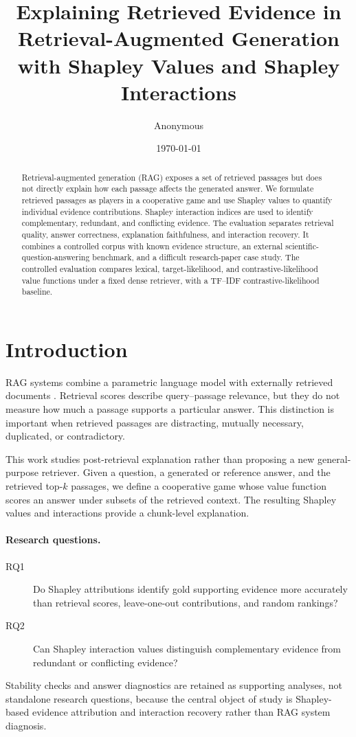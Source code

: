 \documentclass[10pt]{article}
\title{Explaining Retrieved Evidence in Retrieval-Augmented Generation\\
with Shapley Values and Shapley Interactions}
\author{Anonymous}
\date{\today}
\begin{document}
\maketitle

\begin{abstract}
Retrieval-augmented generation (RAG) exposes a set of retrieved passages but
does not directly explain how each passage affects the generated answer.
We formulate retrieved passages as players in a cooperative game and use
Shapley values to quantify individual evidence contributions. Shapley
interaction indices are used to identify complementary, redundant, and
conflicting evidence. The evaluation separates retrieval quality, answer
correctness, explanation faithfulness, and interaction recovery. It combines
a controlled corpus with known evidence structure, an external
scientific-question-answering benchmark, and a difficult research-paper case
study. The controlled evaluation compares lexical, target-likelihood, and
contrastive-likelihood value functions under a fixed dense retriever, with a
TF--IDF contrastive-likelihood baseline.
\end{abstract}

\section{Introduction}
RAG systems combine a parametric language model with externally retrieved
documents \cite{lewis2020rag}. Retrieval scores describe query--passage relevance, but they do not
measure how much a passage supports a particular answer. This distinction is
important when retrieved passages are distracting, mutually necessary,
duplicated, or contradictory.

This work studies post-retrieval explanation rather than proposing a new
general-purpose retriever. Given a question, a generated or reference answer,
and the retrieved top-$k$ passages, we define a cooperative game whose value
function scores an answer under subsets of the retrieved context. The resulting
Shapley values and interactions provide a chunk-level explanation.

\paragraph{Research questions.}
\begin{description}
  \item[RQ1] Do Shapley attributions identify gold supporting evidence more
  accurately than retrieval scores, leave-one-out contributions, and random
  rankings?
  \item[RQ2] Can Shapley interaction values distinguish complementary evidence
  from redundant or conflicting evidence?
\end{description}
Stability checks and answer diagnostics are retained as supporting analyses,
not standalone research questions, because the central object of study is
Shapley-based evidence attribution and interaction recovery rather than RAG
system diagnosis.
\end{document}
